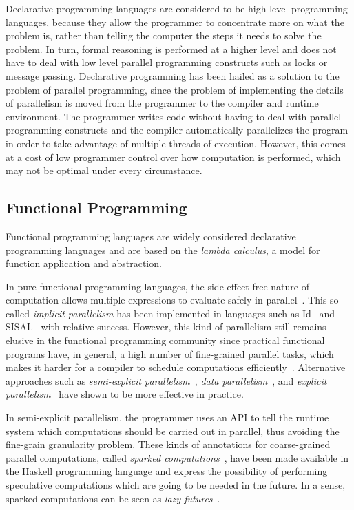 Declarative programming languages are considered to be high-level programming
languages, because they allow the programmer to concentrate more on what the
problem is, rather than telling the computer the steps it needs to solve the
problem. In turn, formal reasoning is performed at a higher level and does not
have to deal with low level parallel programming constructs such as locks or
message passing. Declarative programming has been hailed as a solution to the
problem of parallel programming, since the problem of implementing the details
of parallelism is moved from the programmer to the compiler and runtime
environment. The programmer writes code without having to deal with parallel
programming constructs and the compiler automatically parallelizes the program
in order to take advantage of multiple threads of execution. However, this
comes at a cost of low programmer control over how computation is performed,
which may not be optimal under every circumstance.

\subsection{Functional Programming}

Functional programming languages are widely considered declarative programming
languages and are based on the \emph{lambda calculus}, a model for function
application and abstraction.

In pure functional programming languages, the side-effect free nature of
computation allows multiple expressions to evaluate safely in
parallel~\cite{Loidl:2003}. This so called \emph{implicit parallelism} has been
implemented in languages such as Id~\cite{Nikhil93anoverview} and
SISAL~\cite{gaudiot2001sisal} with relative success. However, this kind of
parallelism still remains elusive in the functional programming community since
practical functional programs have, in general, a high number of fine-grained
parallel tasks, which makes it harder for a compiler to schedule computations
efficiently~\cite{haskell_tutorial}.  Alternative approaches such as
\emph{semi-explicit parallelism}~\cite{Marlow:2010}, \emph{data
parallelism}~\cite{Blelloch:1996:PPA:227234.227246,Chakravarty07dataparallel,peytonjones:2008},
and \emph{explicit parallelism}~\cite{harris2005composable} have shown to be
more effective in practice.

In semi-explicit parallelism, the programmer uses an API to tell the runtime
system which computations should be carried out in parallel, thus avoiding the
fine-grain granularity problem. These kinds of annotations for coarse-grained
parallel computations, called \emph{sparked computations}~\cite{Marlow:2010},
have been made available in the Haskell programming language and express the
possibility of performing speculative computations which are going to be needed
in the future. In a sense, sparked computations can be seen as \emph{lazy
futures}~\cite{Baker:1977}.

